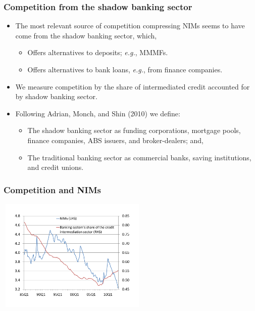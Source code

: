 \documentclass[handout]{beamer}
\begin{document}
\begin{frame}
\frametitle{Competition from the shadow banking sector}

\begin{itemize}
\item \vspace{0.0in} The most relevant source of competition compressing NIMs seems to have come from the shadow banking sector, which,
\begin{itemize}
\item \vspace{0.1in} Offers alternatives to deposits; \emph{e.g.}, MMMFs.
\item \vspace{0.1in} Offers alternatives to bank loans, \emph{e.g.}, from finance companies.
\end{itemize}
\item \vspace{0.125in} We measure competition by the share of intermediated credit accounted for by shadow banking sector.
\item \vspace{0.125in} Following Adrian, Monch, and Shin (2010) we define:
\begin{itemize}
\item \vspace{0.1in} The shadow banking sector as funding corporations, mortgage pools, finance companies, ABS issuers, and broker-dealers; and,
\item \vspace{0.1in} The traditional banking sector as commercial banks, saving institutions, and credit unions.
\end{itemize}
\end{itemize}
\end{frame}

\begin{frame}
\frametitle{Competition and NIMs}

\hspace{0.65in}\includegraphics[height=5.4cm,width=7.2cm]{nims_competition_crop.pdf}

\end{frame}
\end{document}
